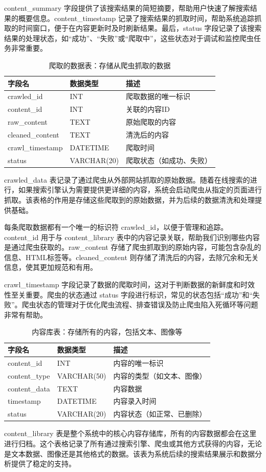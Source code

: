 content\_summary 字段提供了该搜索结果的简短摘要，帮助用户快速了解搜索结果的概要信息。content\_timestamp 记录了搜索结果的抓取时间，帮助系统追踪抓取的时间窗口，便于在内容更新时及时刷新结果。最后，status 字段记录了该搜索结果的处理状态，如“成功”、“失败”或“爬取中”，这些状态对于调试和监控爬虫任务非常重要。
\begin{table}[H]
\centering
\caption{爬取的数据表：存储从爬虫抓取的数据}
\label{tab:crawled_data}
{\renewcommand{\arraystretch}{1}
\begin{tabular}{|p{3cm}|p{3cm}|p{6cm}|}
\hline
\textbf{字段名} & \textbf{数据类型} & \textbf{描述} \\ \hline
crawled\_id & INT & 爬取数据的唯一标识 \\ \hline
content\_id & INT & 关联的内容ID \\ \hline
raw\_content & TEXT & 原始爬取的内容 \\ \hline
cleaned\_content & TEXT & 清洗后的内容 \\ \hline
crawl\_timestamp & DATETIME & 爬取时间 \\ \hline
status & VARCHAR(20) & 爬取状态（如成功、失败） \\ \hline
\end{tabular}
}
\end{table}
crawled\_data 表记录了通过爬虫从外部网站抓取的原始数据。随着在线搜索的进行，如果搜索引擎认为需要提供更详细的内容，系统会启动爬虫从指定的页面进行抓取。该表格的作用是存储这些爬取到的原始数据，并为后续的数据清洗和处理提供基础。

每条爬取数据都有一个唯一的标识符 crawled\_id，以便于管理和追踪。content\_id 用于与 content\_library 表中的内容记录关联，帮助我们识别哪些内容是通过爬虫获取的。raw\_content 存储了爬虫抓取到的原始内容，可能包含杂乱的信息、HTML标签等。cleaned\_content 则存储了清洗后的内容，去除冗余和无关信息，使其更加规范和有用。

crawl\_timestamp 字段记录了数据的爬取时间，这对于判断数据的新鲜度和时效性至关重要。爬虫的状态通过 status 字段进行标识，常见的状态包括“成功”和“失败”。爬虫状态的管理对于优化爬虫流程、排查错误及防止爬虫陷入死循环等问题非常有帮助。
\begin{table}[H]
\centering
\caption{内容库表：存储所有的内容，包括文本、图像等}
\label{tab:content_library}
{\renewcommand{\arraystretch}{1}
\begin{tabular}{|p{3cm}|p{3cm}|p{6cm}|}
\hline
\textbf{字段名} & \textbf{数据类型} & \textbf{描述} \\ \hline
content\_id & INT & 内容的唯一标识 \\ \hline
content\_type & VARCHAR(50) & 内容的类型（如文本、图像） \\ \hline
content\_data & TEXT & 内容数据 \\ \hline
timestamp & DATETIME & 内容录入时间 \\ \hline
status & VARCHAR(20) & 内容状态（如正常、已删除） \\ \hline
\end{tabular}
}
\end{table}
content\_library 表是整个系统中的核心内容存储库，所有的内容数据都会在这里进行归档。这个表格记录了所有通过搜索引擎、爬虫或其他方式获得的内容，无论是文本数据、图像还是其他格式的数据。该表为系统后续的搜索结果展示和数据分析提供了稳定的支持。

